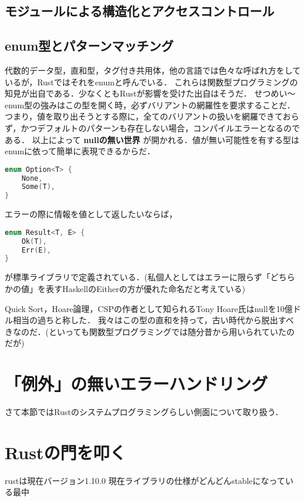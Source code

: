 \subsection{モジュールによる構造化とアクセスコントロール}


\subsection{enum型とパターンマッチング}
代数的データ型，直和型，タグ付き共用体，他の言語では色々な呼ばれ方をしているが，Rustではそれをenumと呼んでいる．
これらは関数型プログラミングの知見が出自である．少なくともRustが影響を受けた出自はそうだ．
せつめい〜
enum型の強みはこの型を開く時，必ずバリアントの網羅性を要求することだ．
つまり，値を取り出そうとする際に，全てのバリアントの扱いを網羅できておらず，かつデフォルトのパターンも存在しない場合，コンパイルエラーとなるのである．
以上によって \textbf{nullの無い世界} が開かれる．値が無い可能性を有する型はenumに依って簡単に表現できるからだ．
\begin{lstlisting}[language={C++},caption=Option型,label=option_t]
enum Option<T> {
    None,
    Some(T),
}
\end{lstlisting}
エラーの際に情報を値として返したいならば，
\begin{lstlisting}[language={C++},caption=Result型,label=result_t]
enum Result<T, E> {
    Ok(T),
    Err(E),
}
\end{lstlisting}
が標準ライブラリで定義されている．(私個人としてはエラーに限らず「どちらかの値」を表すHaskellのEitherの方が優れた命名だと考えている)

Quick Sort，Hoare論理，CSPの作者として知られるTony Hoare氏はnullを10億ドル相当の過ちと称した．
我々はこの型の直和を持って，古い時代から脱出すべきなのだ．(といっても関数型プログラミングでは随分昔から用いられていたのだが)

\section{「例外」の無いエラーハンドリング}
さて本節ではRustのシステムプログラミングらしい側面について取り扱う．

\section{Rustの門を叩く}
rustは現在バージョン1.10.0
現在ライブラリの仕様がどんどんstableになっている最中
